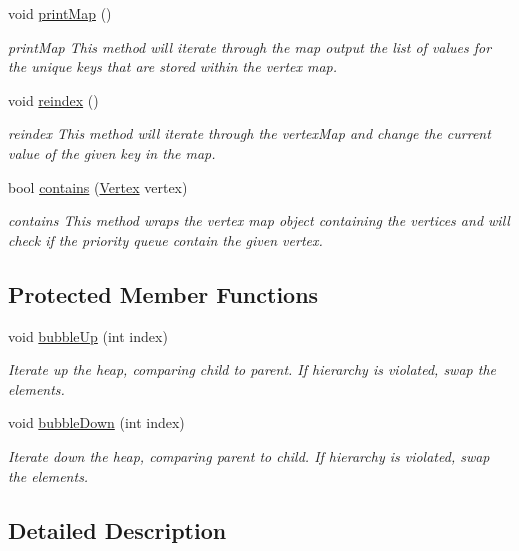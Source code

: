 \begin{DoxyCompactItemize}
void \hyperlink{class_vertex_queue_afcfed2c512980010b15d455b900197c2}{print\+Map} ()
\begin{DoxyCompactList}\small\item\em print\+Map This method will iterate through the map output the list of values for the unique keys that are stored within the vertex map. \end{DoxyCompactList}\item 
void \hyperlink{class_vertex_queue_a96a6521c4c6cf2b3ae782f438096e71a}{reindex} ()
\begin{DoxyCompactList}\small\item\em reindex This method will iterate through the vertex\+Map and change the current value of the given key in the map. \end{DoxyCompactList}\item 
bool \hyperlink{class_vertex_queue_ac0f9e700787d1a135dc9f4bb4c1f797d}{contains} (\hyperlink{class_vertex}{Vertex} vertex)
\begin{DoxyCompactList}\small\item\em contains This method wraps the vertex map object containing the vertices and will check if the priority queue contain the given vertex. \end{DoxyCompactList}\end{DoxyCompactItemize}
\subsection*{Protected Member Functions}
\begin{DoxyCompactItemize}
\item 
void \hyperlink{class_vertex_queue_a715062c609e8d2e15e827fb9f23da470}{bubble\+Up} (int index)
\begin{DoxyCompactList}\small\item\em Iterate up the heap, comparing child to parent. If hierarchy is violated, swap the elements. \end{DoxyCompactList}\item 
void \hyperlink{class_vertex_queue_a274d6b4ed9a62da34cbd1a084e9b30ac}{bubble\+Down} (int index)
\begin{DoxyCompactList}\small\item\em Iterate down the heap, comparing parent to child. If hierarchy is violated, swap the elements. \end{DoxyCompactList}\end{DoxyCompactItemize}


\subsection{Detailed Description}
